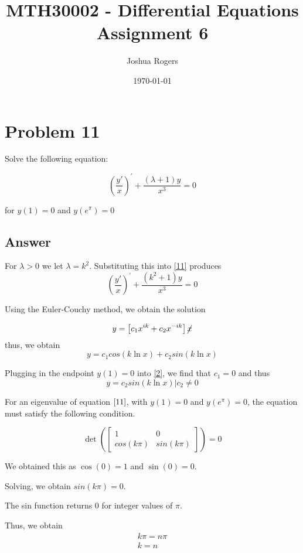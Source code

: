 \documentclass{article}
\title{\vspace{-4cm}MTH30002 - Differential Equations \\Assignment 6}
\author{Joshua Rogers}
\date\today
\begin{document}
\maketitle

\section*{Problem 11}

Solve the following equation:

\begin{equation}\label{11} \left(\frac{y'}{x}\right)^{'} + \frac{\left(\lambda + 1\right)y}{x^3} = 0\end{equation}

for $y(1) = 0$ and $y(e^\pi)=0$
\subsection*{Answer}

For $\lambda > 0$ we let $\lambda = k^2$.
Substituting this into \eqref{11} produces
$$ \left(\frac{y'}{x}\right)^{'} + \frac{\left(k^2 + 1\right)y}{x^3} = 0 $$

Using the Euler-Couchy method, we obtain the solution

$$ y= \left[ c_1 x^{ik} + c_2 x^{-ik}\right] \cancel{x} $$
thus, we obtain
\begin{equation}\label{2}y = c_1 cos\left(k \ln x \right) + c_2 sin\left( k \ln x \right)\end{equation}

Plugging in the endpoint $y(1)=0$ into \eqref{2}, we find that $c_1=0$ and thus
\begin{equation}\label{25}
y = c_2 sin\left(k \ln x \right)\Bigr| c_2 \neq 0
\end{equation}

For an eigenvalue of equation $\eqref{11}$, with $y(1) = 0$ and $y(e^\pi) = 0$, the equation must satisfy the following condition.

$$
\det \left( \begin{bmatrix} 1 & 0 \\ cos(k\pi) & sin(k\pi) \end{bmatrix} \right) = 0
$$

We obtained this as $\cos(0) = 1$ and $\sin(0) = 0$.

Solving, we obtain $sin(k\pi) = 0$.

The sin function returns 0 for integer values of $\pi$.

Thus, we obtain
\begin{align*}k\pi = n\pi \\
k = n
\end{align*}
\end{document}
